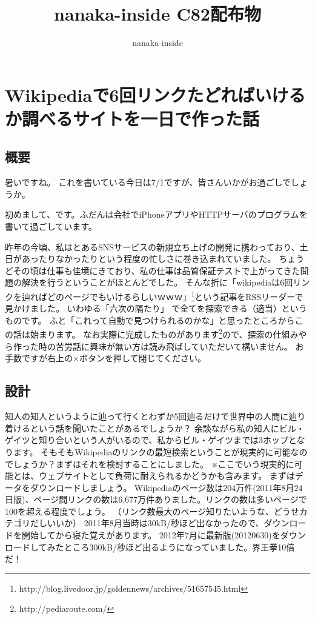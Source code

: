 \documentclass{jsarticle}
\title{nanaka-inside C82配布物}
\author{nanaka-inside}
\begin{document}
\maketitle

\section{Wikipediaで6回リンクたどればいけるか調べるサイトを一日で作った話}
\subsection{概要}
暑いですね。
これを書いている今日は7/1ですが、皆さんいかがお過ごしでしょうか。

初めまして、です。ふだんは会社でiPhoneアプリやHTTPサーバのプログラムを書いて過ごしています。

昨年の今頃、私はとあるSNSサービスの新規立ち上げの開発に携わっており、土日があったりなかったりという程度の忙しさに巻き込まれていました。
ちょうどその頃は仕事も佳境にきており、私の仕事は品質保証テストで上がってきた問題の解決を行うということがほとんどでした。
そんな折に「wikipediaは6回リンクを辿ればどのページでもいけるらしいｗｗｗ」\footnote{http://blog.livedoor.jp/goldennews/archives/51657545.html}という記事をRSSリーダーで見かけました。
いわゆる「六次の隔たり」
で全てを探索できる（適当）というものです。
ふと「これって自動で見つけられるのかな」と思ったところからこの話は始まります。
なお実際に完成したものがあります\footnote{http://pediaroute.com/}ので、探索の仕組みやら作った時の苦労話に興味が無い方は読み飛ばしていただいて構いません。
お手数ですが右上の×ボタンを押して閉じてください。

\subsection{設計}
知人の知人というように辿って行くとわずか5回辿るだけで世界中の人間に辿り着けるという話を聞いたことがあるでしょうか？
余談ながら私の知人にビル・ゲイツと知り合いという人がいるので、私からビル・ゲイツまでは3ホップとなります。
そもそもWikipediaのリンクの最短検索ということが現実的に可能なのでしょうか？まずはそれを検討することにしました。
※ここでいう現実的に可能とは、ウェブサイトとして負荷に耐えられるかどうかも含みます。
まずはデータをダウンロードしましょう。
Wikipediaのページ数は204万件(2011年8月24日版)、ページ間リンクの数は6,677万件ありました。リンクの数は多いページで100を超える程度でしょう。
（リンク数最大のページ知りたいような、どうせカテゴリだしいいか）
2011年8月当時は30kB/秒ほど出なかったので、ダウンロードを開始してから寝た覚えがあります。
2012年7月に最新版(20120630)をダウンロードしてみたところ300kB/秒ほど出るようになっていました。界王拳10倍だ！
\end{document}
